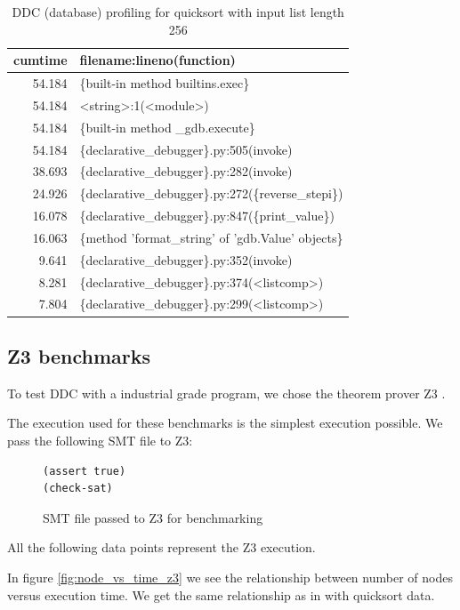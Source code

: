 \begin{table}
\caption{DDC (database) profiling for quicksort with input list length 256}
\label{table:DDC_profile}
\begin{tabular}{rl}
cumtime & filename:lineno(function)\\
\hline
54.184 & \{built-in method builtins.exec\}\\
54.184 & <string>:1(<module>)\\
54.184 & \{built-in method \_gdb.execute\}\\
54.184 & \{declarative\_debugger\}.py:505(invoke)\\
38.693 & \{declarative\_debugger\}.py:282(invoke)\\
24.926 & \{declarative\_debugger\}.py:272(\{reverse\_stepi\})\\
16.078 & \{declarative\_debugger\}.py:847(\{print\_value\})\\
16.063 & \{method 'format\_string'  of 'gdb.Value'  objects\}\\
9.641 & \{declarative\_debugger\}.py:352(invoke)\\
8.281 & \{declarative\_debugger\}.py:374(<listcomp>)\\
7.804 & \{declarative\_debugger\}.py:299(<listcomp>)\\
\end{tabular}
\end{table}

\subsection{Z3 benchmarks}
To test DDC with a industrial grade program, we chose the theorem prover Z3 \cite{z3}.

The execution used for these benchmarks is the simplest execution possible.
We pass the following SMT file to Z3:
\begin{figure}[htbp]
    \centering
    \caption{SMT file passed to Z3 for benchmarking}
    \label{fig:SMT_file}
    \begin{verbatim}
(assert true)
(check-sat)
    \end{verbatim}
\end{figure}
All the following data points represent the Z3 execution.

In figure \ref{fig:node_vs_time_z3} we see the relationship between number of nodes versus execution time. We get the same relationship as in with quicksort data.

